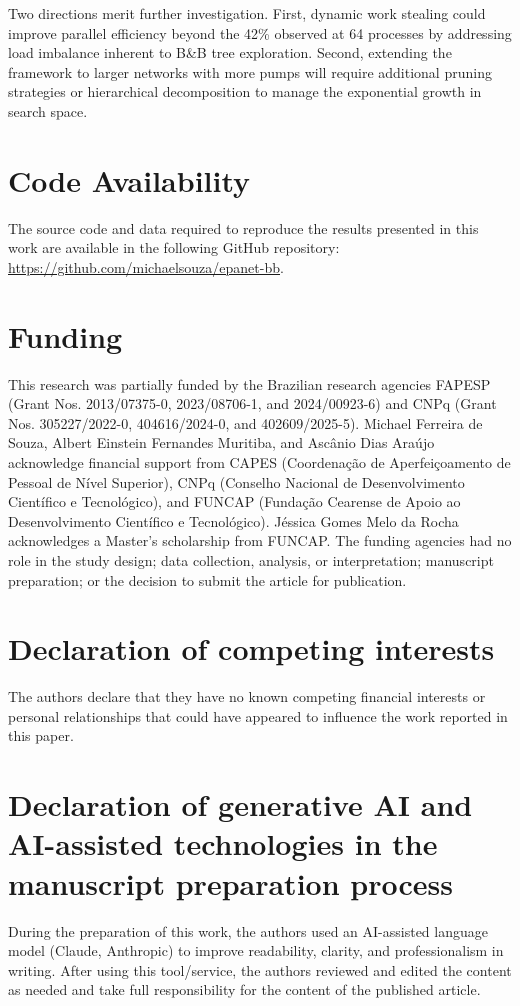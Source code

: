 \documentclass[a4paper,fleqn]{cas-dc}
\begin{document}
Two directions merit further investigation. First, dynamic work stealing could improve parallel efficiency beyond the 42\% observed at 64 processes by addressing load imbalance inherent to B\&B tree exploration. Second, extending the framework to larger networks with more pumps will require additional pruning strategies or hierarchical decomposition to manage the exponential growth in search space.

\section*{Code Availability}

The source code and data required to reproduce the results presented in this work are available in the following GitHub repository: \url{https://github.com/michaelsouza/epanet-bb}.

\section*{Funding}
This research was partially funded by the Brazilian research agencies FAPESP (Grant Nos. 2013/07375-0, 2023/08706-1, and 2024/00923-6) and CNPq (Grant Nos. 305227/2022-0, 404616/2024-0, and 402609/2025-5).
Michael Ferreira de Souza, Albert Einstein Fernandes Muritiba, and Asc\^anio Dias Ara\'ujo acknowledge financial support from CAPES (Coordenação de Aperfeiçoamento de Pessoal de Nível Superior), CNPq (Conselho Nacional de Desenvolvimento Científico e Tecnológico), and FUNCAP (Fundação Cearense de Apoio ao Desenvolvimento Científico e Tecnológico).
J\'essica Gomes Melo da Rocha acknowledges a Master’s scholarship from FUNCAP.
The funding agencies had no role in the study design; data collection, analysis, or interpretation; manuscript preparation; or the decision to submit the article for publication.

\section*{Declaration of competing interests}
The authors declare that they have no known competing financial interests or
personal relationships that could have appeared to influence the work reported
in this paper.

\section*{Declaration of generative AI and AI-assisted technologies in the manuscript preparation process}
During the preparation of this work, the authors used an AI-assisted language model (Claude, Anthropic) to improve readability, clarity, and
professionalism in writing.
After using this tool/service, the authors reviewed and edited the content as
needed and take full responsibility for the content of the published article.

\printcredits

%
%






\end{document}
